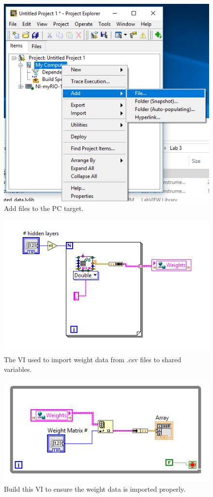 \documentclass{article}
\begin{document}
\begin{figure}[h!]
\centering
\includegraphics[scale=0.7]{figs/_1.png}
\caption{Add files to the PC target.}
\label{fig:_1}
\end{figure}

\begin{figure}[h!]
\centering
\includegraphics[scale=0.8]{figs/_3.png}
\caption{The VI used to import weight data from .csv files to shared variables.}
\label{fig:_3}
\end{figure}

\begin{figure}[h!]
\centering
\includegraphics[scale=0.8]{figs/_7.png}
\caption{Build this VI to ensure the weight data is imported properly.}
\label{fig:_7}
\end{figure}
\end{document}

